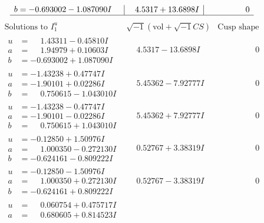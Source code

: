 \documentclass[1p]{elsarticle_modified}
\theoremstyle{definition}
\newcommand{\I}{\sqrt{-1}}
\begin{document}
$$\begin{array}{c|c|c}
\begin{aligned}
b &= -0.693002 - 1.087090 I\end{aligned}
 & \phantom{-}4.5317 + 13.6898 I & \phantom{-0.000000 } 0\\
 \hline 
 \end{array}$$\newpage$$\begin{array}{c|c|c}  
\text{Solutions to }I^u_{1}& \I (\text{vol} + \sqrt{-1}CS) & \text{Cusp shape}\\
 \hline 
\begin{aligned}
u &= \phantom{-}1.43311 - 0.45810 I \\
a &= \phantom{-}1.94979 + 0.10603 I \\
b &= -0.693002 + 1.087090 I\end{aligned}
 & \phantom{-}4.5317 - 13.6898 I & \phantom{-0.000000 } 0 \\ \hline\begin{aligned}
u &= -1.43238 + 0.47747 I \\
a &= -1.90101 + 0.02286 I \\
b &= \phantom{-}0.750615 - 1.043010 I\end{aligned}
 & \phantom{-}5.45362 - 7.92777 I & \phantom{-0.000000 } 0 \\ \hline\begin{aligned}
u &= -1.43238 - 0.47747 I \\
a &= -1.90101 - 0.02286 I \\
b &= \phantom{-}0.750615 + 1.043010 I\end{aligned}
 & \phantom{-}5.45362 + 7.92777 I & \phantom{-0.000000 } 0 \\ \hline\begin{aligned}
u &= -0.12850 + 1.50976 I \\
a &= \phantom{-}1.000350 - 0.272130 I \\
b &= -0.624161 - 0.809222 I\end{aligned}
 & \phantom{-}0.52767 + 3.38319 I & \phantom{-0.000000 } 0 \\ \hline\begin{aligned}
u &= -0.12850 - 1.50976 I \\
a &= \phantom{-}1.000350 + 0.272130 I \\
b &= -0.624161 + 0.809222 I\end{aligned}
 & \phantom{-}0.52767 - 3.38319 I & \phantom{-0.000000 } 0 \\ \hline\begin{aligned}
u &= \phantom{-}0.060754 + 0.475717 I \\
a &= \phantom{-}0.680605 + 0.814523 I \\

\end{aligned}
\end{array}$$
\end{document}
